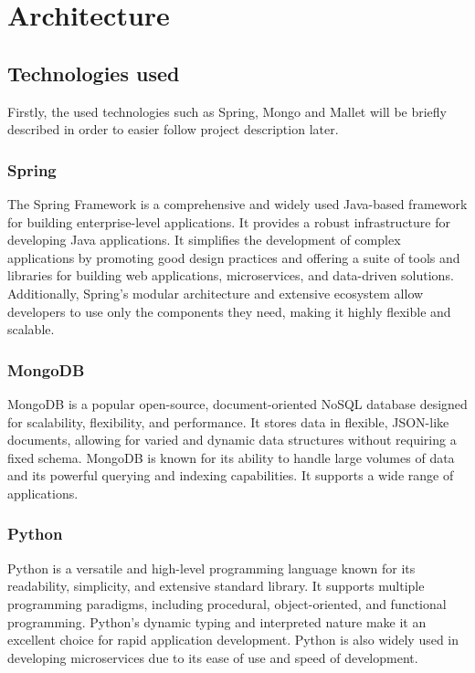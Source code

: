 \section{Architecture}

\label{ch:met}

\subsection{Technologies used}
Firstly, the used technologies such as Spring, Mongo and Mallet will be briefly described in order
to easier follow project description later.
\subsubsection{Spring}
The Spring Framework is a comprehensive and widely used Java-based framework for building
enterprise-level applications. It provides a robust infrastructure for developing Java applications.
It simplifies the development of complex applications by promoting good design practices and
offering a suite of tools and libraries for building web applications, microservices, and
data-driven solutions. Additionally, Spring's modular architecture and extensive ecosystem
allow developers to use only the components they need, making it highly flexible and scalable.
\cite{spring}

\subsubsection{MongoDB}
MongoDB is a popular open-source, document-oriented NoSQL database designed for scalability,
flexibility, and performance. It stores data in flexible, JSON-like documents, allowing for varied
and dynamic data structures without requiring a fixed schema. MongoDB is known for its ability to handle large
volumes of data and its powerful querying and indexing capabilities. It supports a wide range of applications.
\cite{mongodb}

\subsubsection{Python}
Python is a versatile and high-level programming language known for its readability, simplicity, and extensive
standard library. It supports multiple programming paradigms, including procedural, object-oriented, and
functional programming. Python's dynamic typing and interpreted nature make it an excellent choice for rapid
application development. Python is also widely used in developing microservices due to its ease of use and
speed of development. \cite{python}

